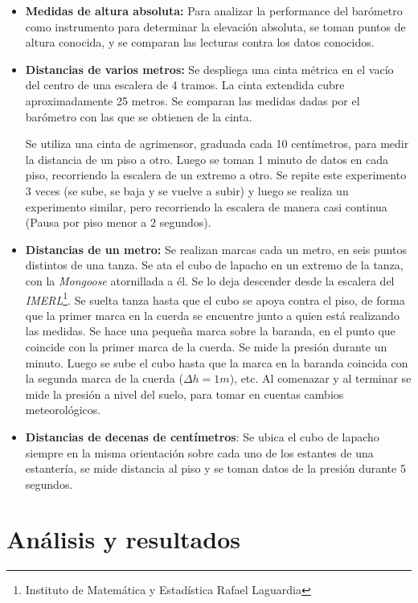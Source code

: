 \documentclass[main]{subfiles}
\begin{document}
\begin{itemize}
\item \textbf{Medidas de altura absoluta:} Para analizar la performance del bar\'ometro como instrumento para determinar la elevaci\'on absoluta, se toman puntos de altura conocida, y se comparan las lecturas contra los datos conocidos.

\item \textbf{Distancias de varios metros:} Se despliega una cinta m\'etrica en el vac\'io del centro de una escalera de 4 tramos. La cinta extendida cubre aproximadamente 25 metros. Se comparan las medidas dadas por el bar\'ometro con las que se obtienen de la cinta.

Se utiliza una cinta de agrimensor, graduada cada 10 cent\'imetros, para medir la distancia de un piso a otro. Luego se toman 1 minuto de datos en cada piso, recorriendo la escalera de un extremo a otro. Se repite este experimento 3 veces (se sube, se baja y se vuelve a subir) y luego se realiza un experimento similar, pero recorriendo la escalera de manera casi continua (Pausa por piso menor a 2 segundos).

\item \textbf{Distancias de un metro:} Se realizan marcas cada un metro, en seis puntos distintos de una tanza. Se ata el cubo de lapacho en un extremo de la tanza, con la \emph{Mongoose} atornillada a \'el. Se lo deja descender desde la escalera del \emph{IMERL}\footnote{Instituto de Matem\'atica y Estad\'istica Rafael Laguardia}. Se suelta tanza hasta que el cubo se apoya contra el piso, de forma que la primer marca en la cuerda se encuentre junto a quien est\'a realizando las medidas. Se hace una peque\~na marca sobre la baranda, en el punto que coincide con la primer marca de la cuerda. Se mide la presi\'on durante un minuto. Luego se sube el cubo hasta que la marca en la baranda coincida con la segunda marca de la cuerda ($\Delta h = 1m$), etc.
Al comenazar y al terminar se mide la presi\'on a nivel del suelo, para tomar en cuentas cambios meteorol\'ogicos.

\item \textbf{Distancias de decenas de cent\'imetros}: Se ubica el cubo de lapacho siempre en la misma orientaci\'on sobre cada uno de los estantes de una estanter\'ia, se mide distancia al piso y se toman datos de la presi\'on durante 5 segundos.

\end{itemize}

\section{An\'alisis y resultados}
\end{document}
